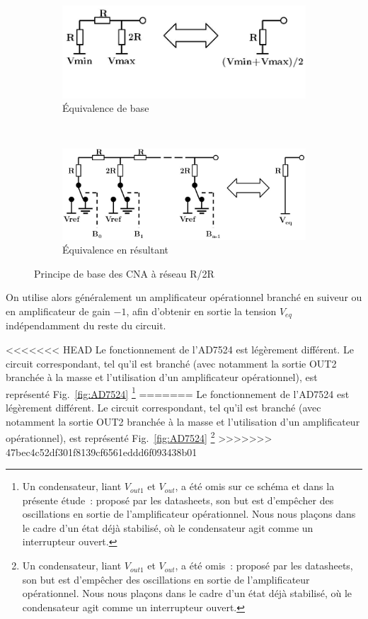 \documentclass{article}
\begin{document}
\begin{figure}[h]
  \centering
  \begin{subfigure}[b]{0.43\textwidth}
    \centering
    \includegraphics[width=\textwidth]{R2Rbasics}
    \caption{Équivalence de base}
    \label{fig:R2Rbase1}
  \end{subfigure}
  ~~~~
  \begin{subfigure}[b]{0.53\textwidth}
    \centering
    \includegraphics[width=\textwidth]{R2Rexpended}
    \caption{Équivalence en résultant}
    \label{fig:R2Rbase2}
  \end{subfigure}
  \caption{Principe de base des CNA à réseau R/2R}
\end{figure}

On utilise alors généralement un amplificateur opérationnel branché en suiveur ou en amplificateur de gain $-1$, afin d'obtenir en sortie la tension $V_{eq}$ indépendamment du reste du circuit.


<<<<<<< HEAD
Le fonctionnement de l'AD7524 est légèrement différent. Le circuit correspondant, tel qu'il est branché (avec notamment la sortie OUT2 branchée à la masse et l'utilisation d'un amplificateur opérationnel), est représenté Fig.~\ref{fig:AD7524} \footnote{Un condensateur, liant $V_{out1}$ et $V_{out}$, a été omis sur ce schéma et dans la présente étude~: proposé par les datasheets, son but est d'empêcher des oscillations en sortie de l'amplificateur opérationnel. Nous nous plaçons dans le cadre d'un état déjà stabilisé, où le condensateur agit comme un interrupteur ouvert.}
=======
Le fonctionnement de l'AD7524 est légèrement différent. Le circuit correspondant, tel qu'il est branché (avec notamment la sortie OUT2 branchée à la masse et l'utilisation d'un amplificateur opérationnel), est représenté Fig.~\ref{fig:AD7524} \footnote{Un condensateur, liant $V_{out1}$ et $V_{out}$, a été omis~: proposé par les datasheets, son but est d'empêcher des oscillations en sortie de l'amplificateur opérationnel. Nous nous plaçons dans le cadre d'un état déjà stabilisé, où le condensateur agit comme un interrupteur ouvert.}
>>>>>>> 47bec4c52df301f8139cf6561eddd6f093438b01
\end{document}
